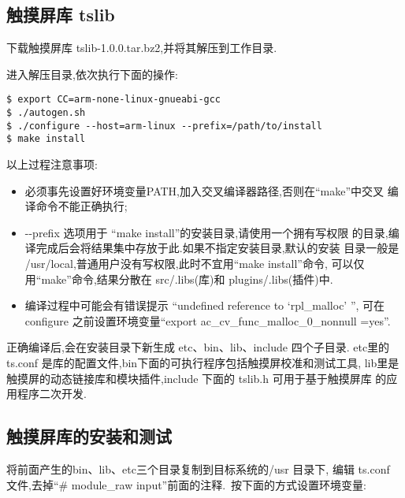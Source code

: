 \subsection{触摸屏库 tslib}
	下载触摸屏库 tslib-1.0.0.tar.bz2,并将其解压到工作目录.

	进入解压目录,依次执行下面的操作:

\begin{boxedminipage}{.9\textwidth}
\begin{verbatim}
$ export CC=arm-none-linux-gnueabi-gcc
$ ./autogen.sh
$ ./configure --host=arm-linux --prefix=/path/to/install
$ make install
\end{verbatim}
\end{boxedminipage}

	以上过程注意事项:
\begin{itemize}
  \item 必须事先设置好环境变量PATH,加入交叉编译器路径,否则在``make''中交叉
	编译命令不能正确执行;
  \item -{}-prefix 选项用于 ``make install''的安装目录,请使用一个拥有写权限
	的目录,编译完成后会将结果集中存放于此.如果不指定安装目录,默认的安装
	目录一般是 /usr/local,普通用户没有写权限,此时不宜用``make install''命令,
	可以仅用``make''命令,结果分散在 src/.libs(库)和 plugins/.libs(插件)中.
  \item 编译过程中可能会有错误提示 ``undefined reference to `rpl\_malloc' '',
	可在 configure 之前设置环境变量``export ac\_cv\_func\_malloc\_0\_nonnull
	=yes''.
\end{itemize}

	正确编译后,会在安装目录下新生成 etc、bin、lib、include 四个子目录.
etc里的 ts.conf 是库的配置文件,bin下面的可执行程序包括触摸屏校准和测试工具,
lib里是触摸屏的动态链接库和模块插件,include 下面的 tslib.h 可用于基于触摸屏库
的应用程序二次开发.

\subsection{触摸屏库的安装和测试}
    将前面产生的bin、lib、etc三个目录复制到目标系统的/usr 目录下, 编辑 ts.conf
文件,去掉``\# module\_raw input''前面的注释.~按下面的方式设置环境变量:


